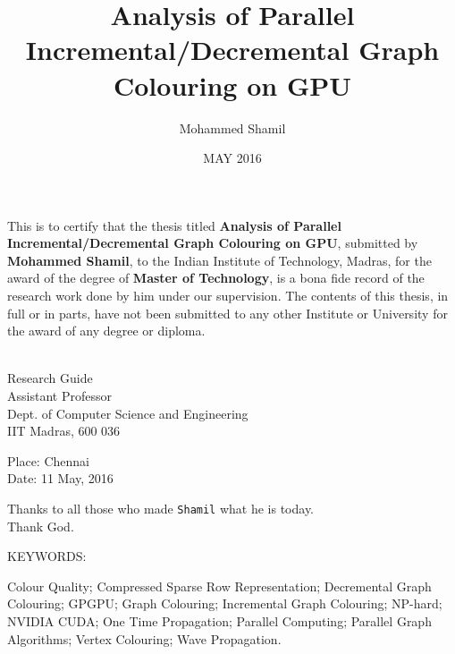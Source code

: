 \documentclass[MTech]{iitmdiss}
\def\thesistitle{Analysis of Parallel Incremental/Decremental Graph Colouring on GPU}
\def\thesisauthor{Mohammed Shamil}
\begin{document}

\title{\thesistitle}

\author{\thesisauthor}

\date{MAY 2016}

\maketitle

\certificate

\vspace*{0.5in}

\noindent This is to certify that the thesis titled {\bf {\thesistitle}}, submitted by {\bf {\thesisauthor}}, 
  to the Indian Institute of Technology, Madras, for
the award of the degree of {\bf Master of Technology}, is a bona fide
record of the research work done by him under our supervision.  The
contents of this thesis, in full or in parts, have not been submitted
to any other Institute or University for the award of any degree or
diploma.

\vspace*{1.5in}
\hspace*{-0.25in}
\begin{singlespace}
 \\
\noindent Research Guide \\ 
\noindent Assistant Professor \\
\noindent Dept. of Computer Science and Engineering\\
\noindent IIT Madras, 600 036 \\
\end{singlespace}
\vspace*{0.25in}
\noindent Place: Chennai\\ 
Date: 11 May, 2016


\acknowledgements

Thanks to all those who made \verb+Shamil+ what he is today.
\\
Thank God.

\abstract

\noindent KEYWORDS: \hspace*{0.5em} \parbox[t]{4.4in}{Colour Quality; Compressed Sparse Row Representation; Decremental Graph Colouring; GPGPU; Graph Colouring; Incremental Graph Colouring; NP-hard; NVIDIA CUDA; One Time Propagation; Parallel Computing; Parallel Graph Algorithms; Vertex Colouring; Wave Propagation.}
\end{document}
